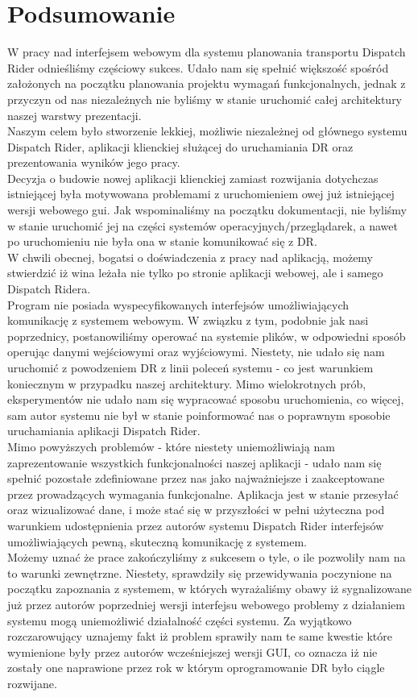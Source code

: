 \chapter{Podsumowanie}

W pracy nad interfejsem webowym dla systemu planowania transportu Dispatch Rider odnieśliśmy częściowy sukces. Udało nam się spełnić większość spośród założonych na początku planowania projektu wymagań funkcjonalnych, jednak z przyczyn od nas niezależnych nie byliśmy w stanie uruchomić całej architektury naszej warstwy prezentacji.\\ 
Naszym celem było stworzenie lekkiej, możliwie niezależnej od głównego systemu Dispatch Rider, aplikacji klienckiej służącej do uruchamiania DR oraz prezentowania wyników jego pracy.\\Decyzja o budowie nowej aplikacji klienckiej zamiast rozwijania dotychczas istniejącej była motywowana problemami z uruchomieniem owej już istniejącej wersji webowego gui. Jak wspominaliśmy na początku dokumentacji, nie byliśmy w stanie uruchomić jej na części systemów operacyjnych/przeglądarek, a nawet po uruchomieniu nie była ona w stanie komunikować się z DR.\\
W chwili obecnej, bogatsi o doświadczenia z pracy nad aplikacją, możemy stwierdzić iż wina leżała nie tylko po stronie aplikacji webowej, ale i samego Dispatch Ridera.\\
Program nie posiada wyspecyfikowanych interfejsów umożliwiających komunikację z systemem webowym. W związku z tym, podobnie jak nasi poprzednicy, postanowiliśmy operować na systemie plików, w odpowiedni sposób operując danymi wejściowymi oraz wyjściowymi.
Niestety, nie udało się nam uruchomić z powodzeniem DR z linii poleceń systemu - co jest warunkiem koniecznym w przypadku naszej architektury. Mimo wielokrotnych prób, eksperymentów nie udało nam się wypracować sposobu uruchomienia, co więcej, sam autor systemu nie był w stanie poinformować nas o poprawnym sposobie uruchamiania aplikacji Dispatch Rider. 
\\
Mimo powyższych problemów - które niestety uniemożliwiają nam zaprezentowanie wszystkich funkcjonalności naszej aplikacji - udało nam się spełnić pozostałe zdefiniowane przez nas jako najważniejsze i zaakceptowane przez prowadzących wymagania funkcjonalne. Aplikacja jest w stanie przesyłać oraz wizualizować dane, i może stać się w przyszłości w pełni użyteczna pod warunkiem udostępnienia przez autorów systemu Dispatch Rider interfejsów umożliwiających pewną, skuteczną komunikację z systemem.\\
Możemy uznać że prace zakończyliśmy z sukcesem o tyle, o ile pozwoliły nam na to warunki zewnętrzne. Niestety, sprawdziły się przewidywania poczynione na początku zapoznania z systemem, w których wyrażaliśmy obawy iż sygnalizowane już przez autorów poprzedniej wersji interfejsu webowego problemy z działaniem systemu mogą uniemożliwić działalność części systemu. Za wyjątkowo rozczarowujący uznajemy fakt iż problem sprawiły nam te same kwestie które wymienione były przez autorów wcześniejszej wersji GUI, co oznacza iż nie zostały one naprawione przez rok w którym oprogramowanie DR było ciągle rozwijane.


